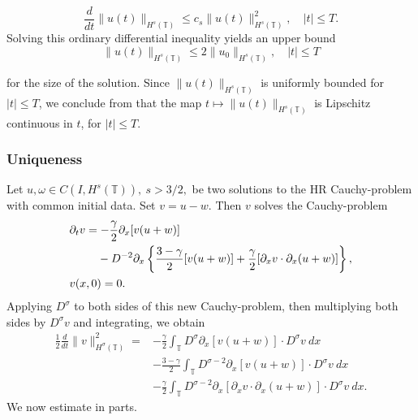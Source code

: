 \documentclass{beamer}
\newcommand{\p}{\partial}
\newcommand{\ci}{\mathbb{T}}
\begin{document}
\begin{frame}
\begin{equation*}
\label{en-est-u-simplified}
\frac{d}{dt} \|u(t)\|_{H^s(\ci)} \le c_s \|u(t)\|_{H^s(\ci)}^2, \quad |t| 
\le T.
\end{equation*}
%
Solving this ordinary differential inequality yields an upper bound
%
%
\begin{equation*}
\label{uniform_bound_for_u}
\|u(t)\|_{H^s(\ci)}
\le
2 \|u_0\|_{H^s(\ci)},
\quad |t| \le T
\end{equation*}
%
%
%


for the size of the solution.  Since $\|u(t)\|_{H^s(\ci)}$
is uniformly bounded for $|t| \le T$, we conclude from
that the map $t \mapsto
\|u(t)\|_{H^s(\ci)}$ is Lipschitz continuous in $t$, for $|t| \le T$. \qquad \qedsymbol
%
%
%
\end{frame}

\begin{frame}
	\frametitle{Uniqueness}
%
%
Let $u,\omega \in C(I, H^s(\ci)), \ s>3/2,$ be two solutions to the HR
Cauchy-problem with
common initial data. Set $v=u-w$. Then $v$ solves the Cauchy-problem
%
%
\begin{align*}
& \p_t v
=  -\frac{\gamma}{2} \p_x [v(u + w)] 
\\
\notag
& \phantom{\p_t v = }- D^{-2} \p_x \left\{
\frac{3-\gamma}{2}[v(u+w)] + \frac{\gamma}{2}[\p_x v \cdot \p_x (u+w)]
\right\},
\\
& v(x,0) = 0.
\label{uniqueness-init-data}
\end{align*}
%
%
%
%
Applying $D^\sigma$ to both sides of this new Cauchy-problem, then 
multiplying both sides by $D^\sigma v$ and integrating, we obtain
%
%
\begin{equation*}
\begin{split}
 \frac{1}{2} \frac{d}{dt} \|v\|_{H^\sigma(\ci)}^2
 = & -\frac{\gamma}{2} \int_{\ci} D^\sigma \p_x [v(u+w)] \cdot
D^\sigma v \ dx
\\
& - \frac{3-\gamma}{2} \int_{\ci}  D^{\sigma -2}
\p_x[v(u+w)] \cdot
D^\sigma v \ dx  
\\
& - \frac{\gamma}{2} \int_{\ci} D^{\sigma 
-2} \p_x [ \p_x v
\cdot \p_x (u+w)]\cdot D^\sigma v \ dx .
\label{2v}
\end{split}
\end{equation*}
%
%
We now estimate in parts.

\end{frame}
\end{document}
